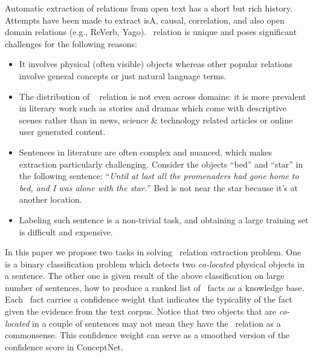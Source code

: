 Automatic extraction of relations from open text has a short but rich history. 
Attempts have been made to extract isA, causal, correlation, and 
also open domain relations (e.g., ReVerb, Yago).
\lnear~relation is unique and poses significant challenges
for the following reasons:
\begin{itemize}
	\item It involves physical (often visible) objects whereas other 
	popular relations involve general concepts or just natural language terms. 
	
	\item The distribution of \lnear~ relation is not even across domains: 
	it is more prevalent in literary work such as stories 
	and dramas which come with descriptive scenes rather
	than in news, science \& technology related articles or online user 
	generated content. 
	
	\item Sentences in literature are often complex and nuanced, 
	which makes extraction particularly challenging. Consider the objects
	``bed'' and ``star'' in the following
	sentence: ``{\em Until at last all the promenaders had gone home to bed, 
	and I was alone with the star.}'' Bed is not near the star because it's at another location.
	
	\item Labeling such sentence is a non-trivial task, 
	and obtaining a large training set is difficult and expensive.
\end{itemize}



In this paper we propose two tasks in solving \lnear\ relation
extraction problem. One is a binary classification problem which detects
two {\em co-located} physical objects in a sentence. 
The other one is given result of the above classification on
large number of sentences, how to produce a ranked list of \lnear\
facts as a knowledge base. Each \lnear\ fact carries a confidence weight
that indicates the typicality of the fact given the evidence from the
text corpus. Notice that two objects that are {\em co-located} 
in a couple of sentences may not mean they have 
the \lnear\ relation as a commonsense. This confidence weight can serve
as a smoothed version of the confidence score in ConceptNet.

